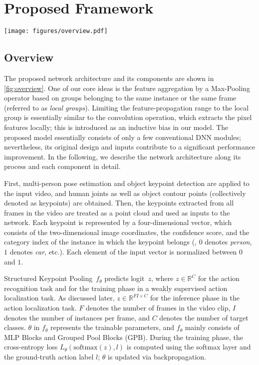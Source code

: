 \documentclass[10pt,twocolumn,letterpaper]{article}
\begin{document}
\section{Proposed Framework}

\begin{figure*}[tb]
  \centering
  \texttt{[image: figures/overview.pdf]}
  \caption{Overview of the Structured Keypoint Pooling network architecture (top) and its original components (bottom).}
  \label{fig:overview}
\end{figure*}

\subsection{Overview}
The proposed network architecture and its components are shown in \cref{fig:overview}.
One of our core ideas is the feature aggregation by a Max-Pooling operator based on groups belonging to the same instance or the same frame (referred to as {\it local groups}).
Limiting the feature-propagation range to the local group is essentially similar to the convolution operation, which extracts the pixel features locally; this is introduced as an inductive bias in our model.
The proposed model essentially consists of only a few conventional DNN modules; nevertheless, its original design and inputs contribute to a significant performance improvement.
In the following, we describe the network architecture along its process and each component in detail.

First, multi-person pose estimation and object keypoint detection are applied to the input video, and human joints as well as object contour points (collectively denoted as keypoints) are obtained.
Then, the keypoints extracted from all frames in the video are treated as a point cloud and used as inputs to the network.
Each keypoint is represented by a four-dimensional vector, which consists of the two-dimensional image coordinates, the confidence score, and the category index of the instance in which the keypoint belongs (\eg, $0$ denotes \textit{person}, $1$ denotes \textit{car}, etc.).
Each element of the input vector is normalized between $0$ and $1$.

Structured Keypoint Pooling~$f_\theta$ predicts logit~$z$, where $z \in \mathbb{R}^C$ for the action recognition task and for the training phase in a weakly supervised action localization task.
As discussed later, $z \in \mathbb{R}^{FI \times C}$ for the inference phase in the action localization task.
$F$ denotes the number of frames in the video clip, $I$ denotes the number of instances per frame, and $C$ denotes the number of target classes.
$\theta$ in $f_\theta$ represents the trainable parameters, and $f_\theta$ mainly consists of MLP Blocks and Grouped Pool Blocks (GPB).
During the training phase, the cross-entropy loss $L_\theta\left(\mathrm{softmax}(z), l\right)$ is computed using the softmax layer and the ground-truth action label $l$; $\theta$ is updated via backpropagation.
\end{document}
